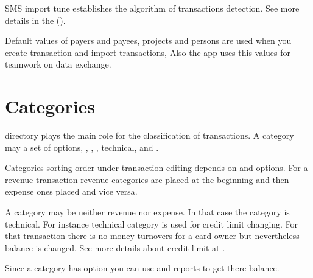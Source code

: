 \documentclass[a4paper,10pt,english]{sphinxmanual}
\begin{document}
\sphinxAtStartPar
SMS import tune establishes the algorithm of transactions detection. See more details in the {\hyperref[\detokenize{notifications:chapter-notifications}]{}} ().

\sphinxAtStartPar
Default values of payers and payees, projects and persons are used when you create transaction
and import transactions, Also the app uses this values for teamwork on data exchange.

\noindent{}

\noindent{}

\noindent{}


\section{Categories}
\label{\detokenize{directories:categories}}
\sphinxAtStartPar
{} directory plays the main role for the classification of transactions.
A category may a set of options,
, , ,
technical,  and  .

\sphinxAtStartPar
Categories sorting order under transaction editing depends on
 and  options. For a revenue transaction
revenue categories are placed at the beginning and then expense ones placed and vice versa.

\sphinxAtStartPar
A category may be neither revenue nor expense. In that case the category is technical. For instance
technical category is used for credit limit changing. For that transaction there is no money turnovers
for a card owner but nevertheless balance is changed. See more details about credit limit at
.

\sphinxAtStartPar
Since a category has  option you can use  and 
reports to get there balance.
\end{document}
